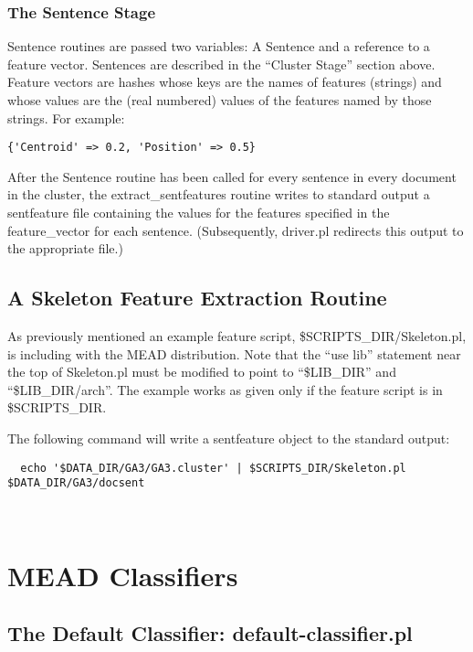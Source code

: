 \documentclass[10pt]{article}
\begin{document}
\subsubsection{The Sentence Stage}

Sentence routines are passed two variables: A Sentence and a reference
to a feature vector.  Sentences are described in the ``Cluster
Stage'' section above.  Feature vectors are hashes whose keys
are the names of features (strings) and whose values are the 
(real numbered) values of the features named by those strings.  
For example:

\begin{verbatim}
{'Centroid' => 0.2, 'Position' => 0.5}
\end{verbatim}

After the Sentence routine has been called for every sentence in every
document in the cluster, the extract\_sentfeatures routine writes
to standard output a sentfeature file containing the values for the
features specified in the feature\_vector for each sentence.
(Subsequently, driver.pl redirects this output to the appropriate file.)

\subsection{A Skeleton Feature Extraction Routine}

As previously mentioned an example feature script,
\$SCRIPTS\_DIR/Skeleton.pl, is including with the MEAD
distribution.  Note that the ``use lib''
statement near the top of Skeleton.pl must be modified to point
to ``\$LIB\_DIR'' and ``\$LIB\_DIR/arch''.  The example works as
given only if the feature script is in \$SCRIPTS\_DIR.

The following command will write a sentfeature object to the standard
output:

\begin{verbatim} 
  echo '$DATA_DIR/GA3/GA3.cluster' | $SCRIPTS_DIR/Skeleton.pl $DATA_DIR/GA3/docsent
\end{verbatim}\\






\section{MEAD Classifiers}

\subsection{The Default Classifier: default-classifier.pl}
\end{document}
